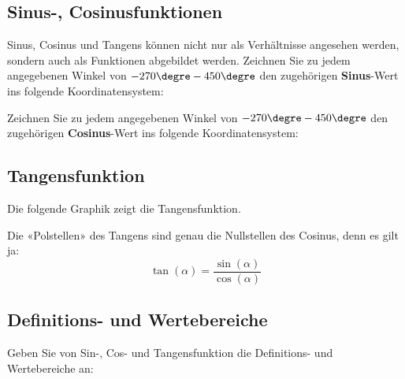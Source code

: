 \subsection{Sinus-, Cosinusfunktionen}
Sinus, Cosinus und Tangens können nicht nur als Verhältnisse angesehen
werden, sondern auch als Funktionen abgebildet werden.
Zeichnen Sie zu jedem angegebenen Winkel von $-270\degre - 450\degre$ den zugehörigen
\textbf{Sinus}-Wert ins folgende Koordinatensystem:

\noTRAINER{\trigsysD}\TRAINER{\trigsysDsin}



Zeichnen Sie zu jedem angegebenen Winkel von $-270\degre - 450\degre$ den zugehörigen
\textbf{Cosinus}-Wert ins folgende Koordinatensystem:

\noTRAINER{\trigsysD}\TRAINER{\trigsysDcos}

\newpage

\subsection{Tangensfunktion}\label{tangensfunktion}
Die folgende Graphik zeigt die Tangensfunktion.




\begin{bemerkung}{}{}
  Die «Polstellen» des Tangens sind genau die Nullstellen des Cosinus, denn es gilt ja:
  $$\tan(\alpha) = \frac{\sin(\alpha)}{\cos(\alpha)}$$
\end{bemerkung}

\newpage

\subsection{Definitions- und Wertebereiche}

Geben Sie von Sin-, Cos- und Tangensfunktion die Definitions- und
Wertebereiche an:

